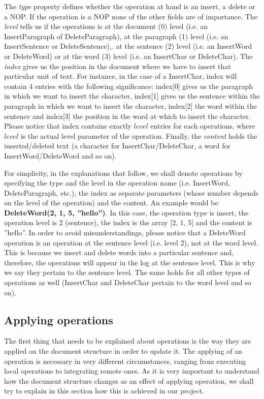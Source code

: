 The \emph{type} property defines whether the operation at hand is an insert, a delete
or a NOP. If the operation is a NOP none of the other fields are of importance. The
\emph{level} tells us if the operations is at the document (0) level (i.e. an InsertParagraph
of DeleteParagraph), at the paragraph (1) level (i.e. an InsertSentence or DeleteSentence),.
at the sentence (2) level (i.e. an InsertWord or DeleteWord) or at the word (3) level
(i.e. an InsertChar or DeleteChar). The \emph{index} gives us the position in the document
where we have to insert that particular unit of text. For instance, in the case of a
InsertChar, index will contain 4 entries with the following significance: index[0] gives
us the paragraph in which we want to insert the character, index[1] gives us the sentence
within the paragraph in which we want to insert the character, index[2] the word within
the sentence and index[3] the position in the word at which to insert the character.
Please notice that index contains exactly $level$ entries for each operations, where
$level$ is the actual level parameter of the operation. Finally, the \emph{content}
holds the inserted/deleted text (a character for InsertChar/DeleteChar, a word for
InsertWord/DeleteWord and so on).

For simplicity, in the explanations that follow, we shall denote operations by specifying
the type and the level in the operation name (i.e. InsertWord, DeleteParagraph, etc.), the
index as separate parameters (whose number depends on the level of the operation) and 
the content. An example would be \textbf{DeleteWord(2, 1, 5, ''hello'')}. In this case,
the operation type is insert, the operation level is 2 (sentence), the index is the array
[2, 1, 5] and the content is ''hello''. In order to avoid misunderstandings, please notice
that a DeleteWord operation is an operation at the sentence level (i.e. level 2), not at
the word level. This is because we insert and delete words into a particular sentence and,
therefore, the operations will appear in the log at the sentence level. This is why we say
they pertain to the sentence level. The same holds for all other types of operations as
well (InsertChar and DeleteChar pertain to the word level and so on).

\subsection{Applying operations}
\label{sec:applyop}

The first thing that needs to be explained about operations is the way they are applied
on the document structure in order to update it. The applying of an operation is necessary
in very different circumstances, ranging from executing local operations to  integrating
remote ones. As it is very important to understand how the document structure changes as
an effect of applying operation, we shall try to explain in this section how this is
achieved in our project.

